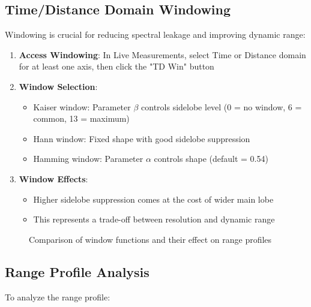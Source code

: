 \documentclass[12pt,a4paper]{article}
\begin{document}
\subsection{Time/Distance Domain Windowing}

Windowing is crucial for reducing spectral leakage and improving dynamic range:

\begin{enumerate}
    \item \textbf{Access Windowing}: In Live Measurements, select Time or Distance domain for at least one axis, then click the "TD Win" button
    
    \item \textbf{Window Selection}:
    \begin{itemize}
        \item Kaiser window: Parameter $\beta$ controls sidelobe level (0 = no window, 6 = common, 13 = maximum)
        \item Hann window: Fixed shape with good sidelobe suppression
        \item Hamming window: Parameter $\alpha$ controls shape (default = 0.54)
    \end{itemize}
    
    \item \textbf{Window Effects}:
    \begin{itemize}
        \item Higher sidelobe suppression comes at the cost of wider main lobe
        \item This represents a trade-off between resolution and dynamic range
    \end{itemize}
\end{enumerate}

\begin{figure}[H]
    \centering
    \caption{Comparison of window functions and their effect on range profiles}
    \label{fig:window_effects}
\end{figure}

\subsection{Range Profile Analysis}

To analyze the range profile:
\end{document}
